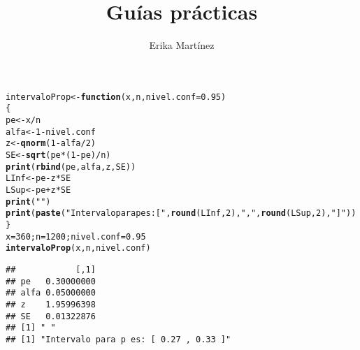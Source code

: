 \documentclass[10pt,a4paper]{article}\usepackage[]{graphicx}\usepackage[]{color}
\author{Erika Martínez}
\title{Guías prácticas}
\makeatletter
\newcommand{\hlnum}[1]{\textcolor[rgb]{0.686,0.059,0.569}{#1}}%
\newcommand{\hlstr}[1]{\textcolor[rgb]{0.192,0.494,0.8}{#1}}%
\newcommand{\hlopt}[1]{\textcolor[rgb]{0,0,0}{#1}}%
\newcommand{\hlstd}[1]{\textcolor[rgb]{0.345,0.345,0.345}{#1}}%
\newcommand{\hlkwa}[1]{\textcolor[rgb]{0.161,0.373,0.58}{\textbf{#1}}}%
\newcommand{\hlkwb}[1]{\textcolor[rgb]{0.69,0.353,0.396}{#1}}%
\newcommand{\hlkwc}[1]{\textcolor[rgb]{0.333,0.667,0.333}{#1}}%
\newcommand{\hlkwd}[1]{\textcolor[rgb]{0.737,0.353,0.396}{\textbf{#1}}}%
\newenvironment{kframe}{%
 \def\at@end@of@kframe{}%
 \ifinner\ifhmode%
  \def\at@end@of@kframe{\end{minipage}}%
  \begin{minipage}{\columnwidth}%
 \fi\fi%
 \def\FrameCommand##1{\hskip\@totalleftmargin \hskip-\fboxsep
 \colorbox{shadecolor}{##1}\hskip-\fboxsep
     \hskip-\linewidth \hskip-\@totalleftmargin \hskip\columnwidth}%
 \MakeFramed {\advance\hsize-\width
   \@totalleftmargin\z@ \linewidth\hsize
   \@setminipage}}%
 {\par\unskip\endMakeFramed%
 \at@end@of@kframe}
\newenvironment{knitrout}{}{} %
\makeatother
\begin{document}
\maketitle
\newpage

\begin{knitrout}
\color{fgcolor}\begin{kframe}
\begin{alltt}
\hlstd{intervaloProp} \hlkwb{<-} \hlkwa{function}\hlstd{(}\hlkwc{x}\hlstd{,} \hlkwc{n}\hlstd{,} \hlkwc{nivel.conf}\hlstd{=}\hlnum{0.95}\hlstd{)}
\hlstd{\{}
\hlstd{pe} \hlkwb{<-} \hlstd{x}\hlopt{/}\hlstd{n}
\hlstd{alfa} \hlkwb{<-} \hlnum{1}\hlopt{-}\hlstd{nivel.conf}
\hlstd{z} \hlkwb{<-} \hlkwd{qnorm}\hlstd{(}\hlnum{1}\hlopt{-}\hlstd{alfa}\hlopt{/}\hlnum{2}\hlstd{)}
\hlstd{SE} \hlkwb{<-} \hlkwd{sqrt}\hlstd{(pe}\hlopt{*}\hlstd{(}\hlnum{1}\hlopt{-}\hlstd{pe)}\hlopt{/}\hlstd{n)}
\hlkwd{print}\hlstd{(}\hlkwd{rbind}\hlstd{(pe, alfa, z, SE))}
\hlstd{LInf} \hlkwb{<-} \hlstd{pe}\hlopt{-}\hlstd{z}\hlopt{*}\hlstd{SE}
\hlstd{LSup} \hlkwb{<-} \hlstd{pe}\hlopt{+}\hlstd{z}\hlopt{*}\hlstd{SE}
\hlkwd{print}\hlstd{(}\hlstr{" "}\hlstd{)}
\hlkwd{print}\hlstd{(}\hlkwd{paste}\hlstd{(}\hlstr{"Intervalo para p es: ["}\hlstd{,} \hlkwd{round}\hlstd{(LInf,} \hlnum{2}\hlstd{),} \hlstr{","}\hlstd{,} \hlkwd{round}\hlstd{(LSup,} \hlnum{2}\hlstd{),} \hlstr{"]"}\hlstd{))}
\hlstd{\}}
\hlstd{x}\hlkwb{=}\hlnum{360}\hlstd{; n}\hlkwb{=}\hlnum{1200}\hlstd{; nivel.conf}\hlkwb{=}\hlnum{0.95}
\hlkwd{intervaloProp}\hlstd{(x, n, nivel.conf)}
\end{alltt}
\begin{verbatim}
##            [,1]
## pe   0.30000000
## alfa 0.05000000
## z    1.95996398
## SE   0.01322876
## [1] " "
## [1] "Intervalo para p es: [ 0.27 , 0.33 ]"
\end{verbatim}
\end{kframe}
\end{knitrout}
\end{document}
